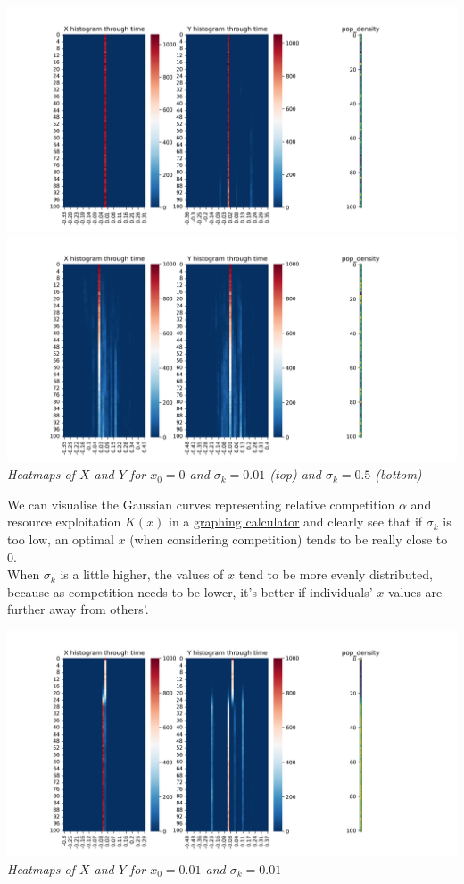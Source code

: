 \documentclass{article}
\begin{document}
\begin{center}
\includegraphics[scale=0.37]{x0_sk_sweep_(0.0)_(0.01)}
\includegraphics[scale=0.37]{x0_sk_sweep_(0.0)_(0.5)} \\
\textit{Heatmaps of $X$ and $Y$ for $x_0=0$ and $\sigma_k=0.01$ (top) and $\sigma_k=0.5$ (bottom)}
\end{center}

We can visualise the Gaussian curves representing relative competition $\alpha$ and resource exploitation $K(x)$ in a \textcolor{blue}{\underline{\href{https://www.geogebra.org/m/bzwgrcez}{graphing calculator}}} and clearly see that if $\sigma_k$ is too low, an optimal $x$ (when considering competition) tends to be really close to $0$. \\
When $\sigma_k$ is a little higher, the values of $x$ tend to be more evenly distributed, because as competition needs to be lower, it's better if individuals' $x$ values are further away from others'. \\
\vspace{5mm}

\begin{center}
\includegraphics[scale=0.5]{x0_sk_sweep_(0.01)_(0.01).png}
\textit{Heatmaps of $X$ and $Y$ for $x_0=0.01$ and $\sigma_k=0.01$}
\end{center}
\end{document}
